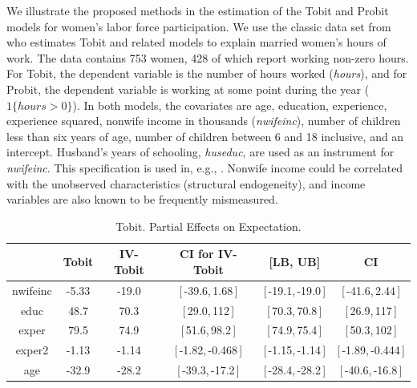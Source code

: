 \documentclass[12pt]{article}
\begin{document}
We illustrate the proposed methods in the estimation of the Tobit and Probit
models for women's labor force participation. We use the classic data set
from \cite{Mroz1987Ecta} who estimates Tobit and related models to explain
married women's hours of work. The data contains 753 women, 428 of which
report working non-zero hours. For Tobit, the dependent variable is the
number of hours worked (\textit{hours}), and for Probit, the dependent
variable is working at some point during the year ($1\{hours>0\}$). In both
models, the covariates are age, education, experience, experience squared,
nonwife income in thousands (\textit{nwifeinc}), number of children less
than six years of age, number of children between 6 and 18 inclusive, and an
intercept. Husband's years of schooling, \textit{huseduc}, are used as an
instrument for \textit{nwifeinc}. This specification is used in, e.g., \cite%
{Wooldridge2010Book}. Nonwife income could be correlated with the unobserved
characteristics (structural endogeneity), and income variables are also
known to be frequently mismeasured.

\begin{table}[!h]
  \begin{center}
  \begin{tabular}{|c|c|cc|cc|}
    \hline\hline
   &  Tobit & IV-Tobit & CI for IV-Tobit & [LB, UB] & CI \\ \hline
    nwifeinc &  -5.33 & -19.0 & [\,-39.6,\,1.68\,] & [\,-19.1,\,-19.0\,] & [\,-41.6,\,2.44\,]\\ 
    educ &  48.7 & 70.3 & [\,29.0,\,112\,] & [\,70.3,\,70.8\,] & [\,26.9,\,117\,]\\ 
    exper &  79.5 & 74.9 & [\,51.6,\,98.2\,] & [\,74.9,\,75.4\,] & [\,50.3,\,102\,]\\ 
    exper2 &  -1.13 & -1.14 & [\,-1.82,\,-0.468\,] & [\,-1.15,\,-1.14\,] & [\,-1.89,\,-0.444\,]\\ 
    age &  -32.9 & -28.2 & [\,-39.3,\,-17.2\,] & [\,-28.4,\,-28.2\,] & [\,-40.6,\,-16.8\,]\\ 
  \hline\hline
  \end{tabular}
  \caption{Tobit. Partial Effects on Expectation.}
  \label{table:Emp-Tobit-PEM-E-w-CI}
  \end{center}
\end{table}
\end{document}
